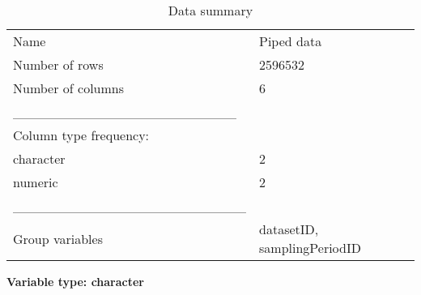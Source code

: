 \documentclass[
  letterpaper,
  DIV=11,
  numbers=noendperiod]{scrreprt}
\begin{document}
\begin{longtable}[]{@{}ll@{}}
\caption{Data summary}\tabularnewline
\toprule\noalign{}
\endfirsthead
\endhead
\bottomrule\noalign{}
\endlastfoot
Name & Piped data \\
Number of rows & 2596532 \\
Number of columns & 6 \\
\_\_\_\_\_\_\_\_\_\_\_\_\_\_\_\_\_\_\_\_\_\_\_ & \\
Column type frequency: & \\
character & 2 \\
numeric & 2 \\
\_\_\_\_\_\_\_\_\_\_\_\_\_\_\_\_\_\_\_\_\_\_\_\_ & \\
Group variables & datasetID, samplingPeriodID \\
\end{longtable}

\textbf{Variable type: character}
\end{document}
